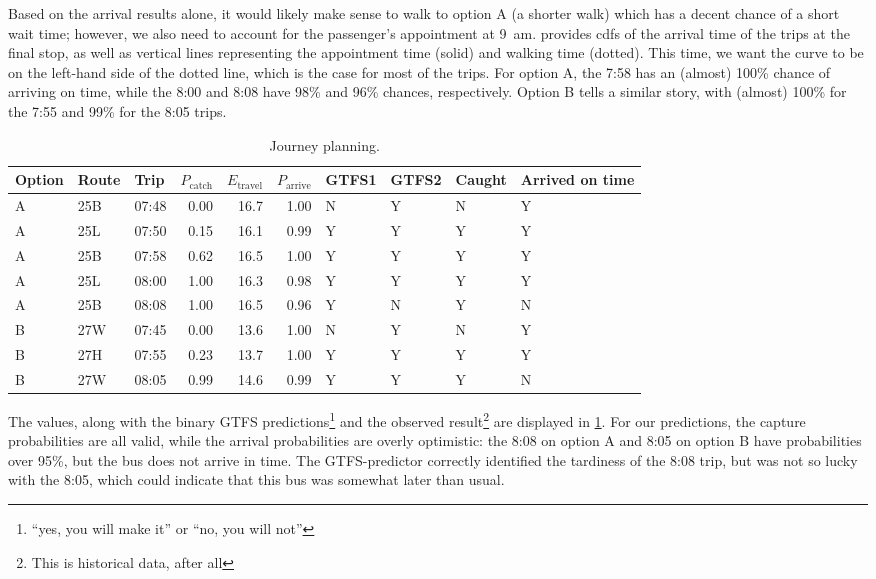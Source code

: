 Based on the arrival results alone, it would likely make sense to walk to option A (a shorter walk) which has a decent chance of a short wait time; however, we also need to account for the passenger's appointment at 9~am.  provides \glspl{cdf} of the arrival time of the trips at the final stop, as well as vertical lines representing the appointment time (solid) and walking time (dotted). This time, we want the curve to be on the left-hand side of the dotted line, which is the case for most of the trips. For option A, the 7:58 has an (almost) 100\% chance of arriving on time, while the 8:00 and 8:08 have 98\% and 96\% chances, respectively. Option B tells a similar story, with (almost) 100\% for the 7:55 and 99\% for the 8:05 trips.


\begin{knitrout}
\color{fgcolor}\begin{table}

\caption{\label{tab:eta_journey_results}Journey planning.}
\centering
\begin{tabular}[t]{lllrrrllll}
\toprule
Option & Route & Trip & $P_\text{catch}$ & $E_\text{travel}$ & $P_\text{arrive}$ & GTFS1 & GTFS2 & Caught & Arrived on time\\
\midrule
A & 25B & 07:48 & 0.00 & 16.7 & 1.00 & N & Y & N & Y\\
A & 25L & 07:50 & 0.15 & 16.1 & 0.99 & Y & Y & Y & Y\\
A & 25B & 07:58 & 0.62 & 16.5 & 1.00 & Y & Y & Y & Y\\
A & 25L & 08:00 & 1.00 & 16.3 & 0.98 & Y & Y & Y & Y\\
A & 25B & 08:08 & 1.00 & 16.5 & 0.96 & Y & N & Y & N\\
\midrule
B & 27W & 07:45 & 0.00 & 13.6 & 1.00 & N & Y & N & Y\\
B & 27H & 07:55 & 0.23 & 13.7 & 1.00 & Y & Y & Y & Y\\
B & 27W & 08:05 & 0.99 & 14.6 & 0.99 & Y & Y & Y & N\\
\bottomrule
\end{tabular}
\end{table}


\end{knitrout}


The values, along with the binary GTFS predictions\footnote{``yes, you will make it'' or ``no, you will not''} and the observed result\footnote{This is historical data, after all} are displayed in \cref{tab:eta_journey_results}. For our predictions, the capture probabilities are all valid, while the arrival probabilities are overly optimistic: the 8:08 on option A and 8:05 on option B have probabilities over 95\%, but the bus does not arrive in time. The GTFS-predictor correctly identified the tardiness of the 8:08 trip, but was not so lucky with the 8:05, which could indicate that this bus was somewhat later than usual.

